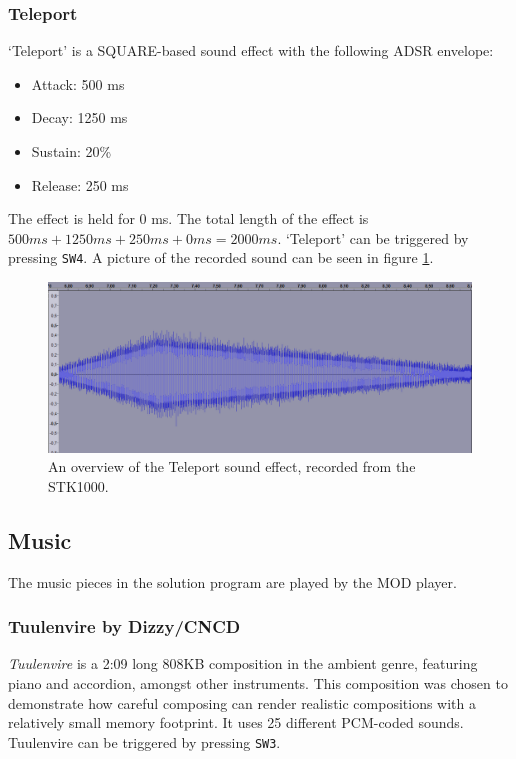 \subsubsection{Teleport}
`Teleport' is a SQUARE-based sound effect with the following ADSR envelope:
\begin{itemize}
	\item{Attack: 500 ms}
	\item{Decay: 1250 ms}
	\item{Sustain: 20\%}
	\item{Release: 250 ms}
\end{itemize}
The effect is held for 0 ms.
The total length of the effect is $500 ms + 1250 ms + 250 ms + 0 ms = 2000 ms$.
`Teleport' can be triggered by pressing \texttt{SW4}.
A picture of the recorded sound can be seen in figure \ref{img-sw4}.

\begin{figure}[H]
	\includegraphics[width = \textwidth]{images/SW4.png}
	\caption{An overview of the Teleport sound effect, recorded from the STK1000.}
	\label{img-sw4}
\end{figure}


\subsection{Music}

The music pieces in the solution program are played by the MOD player.

\subsubsection{Tuulenvire by Dizzy/CNCD}
\emph{Tuulenvire} is a 2:09 long 808KB composition in the ambient genre, featuring piano and accordion, amongst other instruments.
This composition was chosen to demonstrate how careful composing can render realistic compositions with a relatively small memory footprint.
It uses 25 different PCM-coded sounds.
Tuulenvire can be triggered by pressing \texttt{SW3}.

